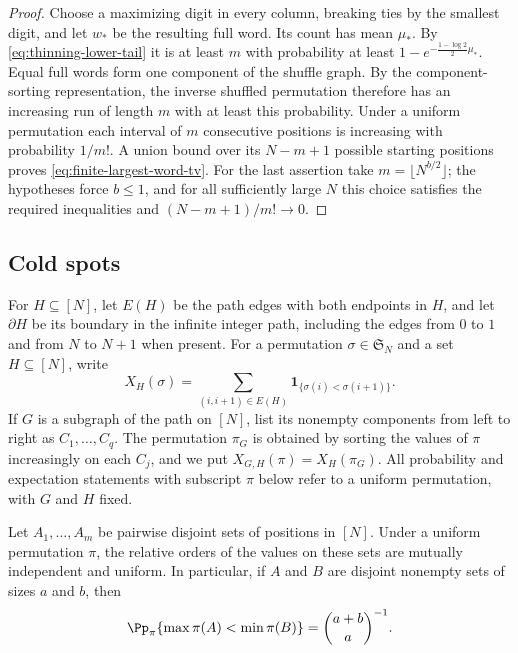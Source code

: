 \begin{proof}
Choose a maximizing digit in every column, breaking ties by the smallest
digit, and let \(w_*\) be the resulting full word. Its count has mean
\(\mu_*\). By \eqref{eq:thinning-lower-tail} it is at least \(m\)
with probability at least \(1-e^{-\frac{1-\log2}{2}\mu_*}\).
Equal full words form one component of the shuffle graph. By
the component-sorting representation, the inverse shuffled permutation
therefore has an increasing run of length \(m\) with at least this
probability. Under a uniform permutation each interval of \(m\) consecutive
positions is increasing with probability \(1/m!\). A union bound over
its \(N-m+1\) possible starting positions proves
\eqref{eq:finite-largest-word-tv}. For the last assertion take
\(m=\lfloor N^{b/2}\rfloor\); the hypotheses force \(b\le1\), and
for all sufficiently large \(N\) this choice satisfies the required
inequalities and \((N-m+1)/m!\to0\).
\end{proof}
\subsection{Cold spots}

For $H\subseteq[N]$, let $E(H)$ be the path edges with both endpoints in $H$, and let $\partial H$ be its boundary in the infinite integer path, including the edges from $0$ to $1$ and from $N$ to $N+1$ when present. For a permutation \(\sigma\in\mathfrak S_N\) and a set \(H\subseteq[N]\),
write
\[
  X_H(\sigma)=\sum_{(i,i+1)\in E(H)}
                 \mathbf 1_{\{\sigma(i)<\sigma(i+1)\}}.
\]
If \(G\) is a subgraph of the path on \([N]\), list its nonempty
components from left to right as \(C_1,\ldots,C_q\).  The permutation
\(\pi_G\) is obtained by sorting the values of \(\pi\) increasingly
on each \(C_j\), and we put \(X_{G,H}(\pi)=X_H(\pi_G)\).
All probability and expectation statements with subscript \(\pi\) below
refer to a uniform permutation, with \(G\) and \(H\) fixed.

\begin{lemma}
\label{lem:relative-order-independence}
Let \(A_1,\ldots,A_m\) be pairwise disjoint sets of positions in
\([N]\).  Under a uniform permutation \(\pi\), the relative orders of
the values on these sets are mutually independent and uniform.  In
particular, if \(A\) and \(B\) are disjoint nonempty sets of sizes
\(a\) and \(b\), then
\[
  \Pp_\pi\{\max\pi(A)<\min\pi(B)\}
  =\binom{a+b}{a}^{-1}.
\]
\end{lemma}

